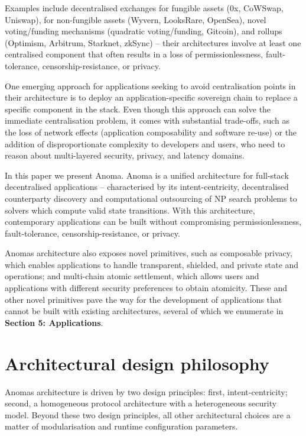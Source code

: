 Examples include decentralised exchanges for fungible assets (0x,
CoWSwap, Uniswap), for non-fungible assets (Wyvern, LooksRare, OpenSea),
novel voting/funding mechanisms (quadratic voting/funding, Gitcoin), and
rollups (Optimism, Arbitrum, Starknet, zkSync) -- their architectures
involve at least one centralised component that often results in a loss
of permissionlessness, fault-tolerance, censorship-resistance, or
privacy.

One emerging approach for applications seeking to avoid centralisation
points in their architecture is to deploy an application-specific
sovereign chain to replace a specific component in the stack. Even
though this approach can solve the immediate centralisation problem, it
comes with substantial trade-offs, such as the loss of network effects
(application composability and software re-use) or the addition of
disproportionate complexity to developers and users, who need to reason
about multi-layered security, privacy, and latency domains.

In this paper we present Anoma. Anoma is a unified architecture for
full-stack decentralised applications -- characterised by its
intent-centricity, decentralised counterparty discovery and
computational outsourcing of NP search problems to solvers which compute
valid state transitions. With this architecture, contemporary
applications can be built without compromising permissionlessness,
fault-tolerance, censorship-resistance, or privacy.

Anoma\textquotesingle s architecture also exposes novel primitives, such
as composable privacy, which enables applications to handle transparent,
shielded, and private state and operations; and multi-chain atomic
settlement, which allows users and applications with different security
preferences to obtain atomicity. These and other novel primitives pave
the way for the development of applications that cannot be built with
existing architectures, several of which we enumerate in \textbf{Section
5: Applications}.

\section{Architectural design
philosophy}\label{architectural-design-philosophy}

Anoma\textquotesingle s architecture is driven by two design principles:
first, intent-centricity; second, a homogeneous protocol architecture
with a heterogeneous security model. Beyond these two design principles,
all other architectural choices are a matter of modularisation and
runtime configuration parameters.

